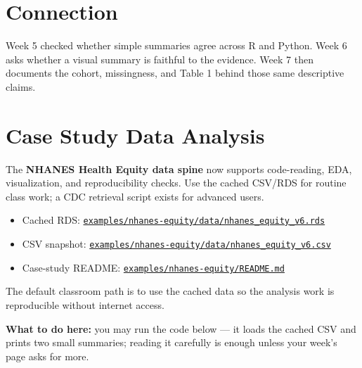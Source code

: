 \documentclass[
  letterpaper,
  DIV=11,
  numbers=noendperiod,
  oneside]{scrreprt}
\providecommand{\tightlist}{%
  \setlength{\itemsep}{0pt}\setlength{\parskip}{0pt}}
\begin{document}
\section*{Connection}\label{connection-5}


Week 5 checked whether simple summaries agree across R and Python. Week
6 asks whether a visual summary is faithful to the evidence. Week 7 then
documents the cohort, missingness, and Table 1 behind those same
descriptive claims.

\section*{Case Study Data Analysis}\label{case-study-data-analysis-3}


The \textbf{NHANES Health Equity data spine} now supports code-reading,
EDA, visualization, and reproducibility checks. Use the cached CSV/RDS
for routine class work; a CDC retrieval script exists for advanced
users.

\begin{itemize}
\tightlist
\item
  Cached RDS:
  \href{https://github.com/ehsanx/HDSx/blob/main/examples/nhanes-equity/data/nhanes_equity_v6.rds}{\texttt{examples/nhanes-equity/data/nhanes\_equity\_v6.rds}}
\item
  CSV snapshot:
  \href{https://github.com/ehsanx/HDSx/blob/main/examples/nhanes-equity/data/nhanes_equity_v6.csv}{\texttt{examples/nhanes-equity/data/nhanes\_equity\_v6.csv}}
\item
  Case-study README:
  \href{https://github.com/ehsanx/HDSx/blob/main/examples/nhanes-equity/README.md}{\texttt{examples/nhanes-equity/README.md}}
\end{itemize}

The default classroom path is to use the cached data so the analysis
work is reproducible without internet access.

\textbf{What to do here:} you may run the code below --- it loads the
cached CSV and prints two small summaries; reading it carefully is
enough unless your week's page asks for more.
\end{document}
